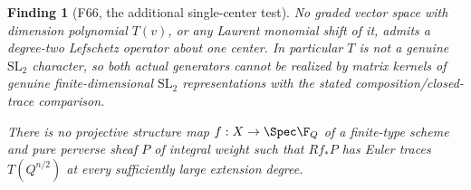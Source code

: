 \documentclass[11pt,a4paper]{article}
\newcommand{\fid}[1]{\textsf{#1}}\newcommand{\gate}[1]{\textsf{#1}}
\theoremstyle{named}\newtheorem{finding}{Finding}[section]
\theoremstyle{definition}\newtheorem{definition}[finding]{Definition}
\theoremstyle{remark}\newtheorem{remark}[finding]{Remark}
\begin{document}
\begin{finding}[\fid{F66}, the additional single-center test]
\label{f:iteratedPositiveLefschetzGate}
No graded vector space with dimension polynomial
\(T(v)\), or any Laurent monomial shift of it,
admits a degree-two Lefschetz operator about one
center. In particular \(T\) is not a genuine
\(\mathrm{SL}_2\) character, so both actual
generators cannot be realized by matrix kernels
of genuine finite-dimensional
\(\mathrm{SL}_2\) representations with the
stated composition/closed-trace comparison.

There is no projective structure map
\(f:X\to\Spec\F_Q\) of a finite-type scheme
and pure perverse sheaf \(P\) of integral weight
such that \(Rf_*P\) has Euler traces
\(T(Q^{n/2})\) at every sufficiently large
extension degree.
\end{finding}
\end{document}
